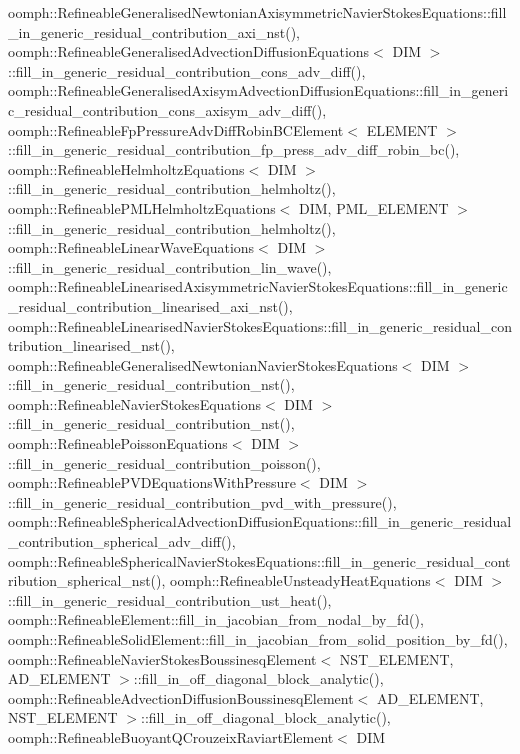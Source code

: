 oomph\+::\+Refineable\+Generalised\+Newtonian\+Axisymmetric\+Navier\+Stokes\+Equations\+::fill\+\_\+in\+\_\+generic\+\_\+residual\+\_\+contribution\+\_\+axi\+\_\+nst(), oomph\+::\+Refineable\+Generalised\+Advection\+Diffusion\+Equations$<$ D\+I\+M $>$\+::fill\+\_\+in\+\_\+generic\+\_\+residual\+\_\+contribution\+\_\+cons\+\_\+adv\+\_\+diff(), oomph\+::\+Refineable\+Generalised\+Axisym\+Advection\+Diffusion\+Equations\+::fill\+\_\+in\+\_\+generic\+\_\+residual\+\_\+contribution\+\_\+cons\+\_\+axisym\+\_\+adv\+\_\+diff(), oomph\+::\+Refineable\+Fp\+Pressure\+Adv\+Diff\+Robin\+B\+C\+Element$<$ E\+L\+E\+M\+E\+N\+T $>$\+::fill\+\_\+in\+\_\+generic\+\_\+residual\+\_\+contribution\+\_\+fp\+\_\+press\+\_\+adv\+\_\+diff\+\_\+robin\+\_\+bc(), oomph\+::\+Refineable\+Helmholtz\+Equations$<$ D\+I\+M $>$\+::fill\+\_\+in\+\_\+generic\+\_\+residual\+\_\+contribution\+\_\+helmholtz(), oomph\+::\+Refineable\+P\+M\+L\+Helmholtz\+Equations$<$ D\+I\+M, P\+M\+L\+\_\+\+E\+L\+E\+M\+E\+N\+T $>$\+::fill\+\_\+in\+\_\+generic\+\_\+residual\+\_\+contribution\+\_\+helmholtz(), oomph\+::\+Refineable\+Linear\+Wave\+Equations$<$ D\+I\+M $>$\+::fill\+\_\+in\+\_\+generic\+\_\+residual\+\_\+contribution\+\_\+lin\+\_\+wave(), oomph\+::\+Refineable\+Linearised\+Axisymmetric\+Navier\+Stokes\+Equations\+::fill\+\_\+in\+\_\+generic\+\_\+residual\+\_\+contribution\+\_\+linearised\+\_\+axi\+\_\+nst(), oomph\+::\+Refineable\+Linearised\+Navier\+Stokes\+Equations\+::fill\+\_\+in\+\_\+generic\+\_\+residual\+\_\+contribution\+\_\+linearised\+\_\+nst(), oomph\+::\+Refineable\+Generalised\+Newtonian\+Navier\+Stokes\+Equations$<$ D\+I\+M $>$\+::fill\+\_\+in\+\_\+generic\+\_\+residual\+\_\+contribution\+\_\+nst(), oomph\+::\+Refineable\+Navier\+Stokes\+Equations$<$ D\+I\+M $>$\+::fill\+\_\+in\+\_\+generic\+\_\+residual\+\_\+contribution\+\_\+nst(), oomph\+::\+Refineable\+Poisson\+Equations$<$ D\+I\+M $>$\+::fill\+\_\+in\+\_\+generic\+\_\+residual\+\_\+contribution\+\_\+poisson(), oomph\+::\+Refineable\+P\+V\+D\+Equations\+With\+Pressure$<$ D\+I\+M $>$\+::fill\+\_\+in\+\_\+generic\+\_\+residual\+\_\+contribution\+\_\+pvd\+\_\+with\+\_\+pressure(), oomph\+::\+Refineable\+Spherical\+Advection\+Diffusion\+Equations\+::fill\+\_\+in\+\_\+generic\+\_\+residual\+\_\+contribution\+\_\+spherical\+\_\+adv\+\_\+diff(), oomph\+::\+Refineable\+Spherical\+Navier\+Stokes\+Equations\+::fill\+\_\+in\+\_\+generic\+\_\+residual\+\_\+contribution\+\_\+spherical\+\_\+nst(), oomph\+::\+Refineable\+Unsteady\+Heat\+Equations$<$ D\+I\+M $>$\+::fill\+\_\+in\+\_\+generic\+\_\+residual\+\_\+contribution\+\_\+ust\+\_\+heat(), oomph\+::\+Refineable\+Element\+::fill\+\_\+in\+\_\+jacobian\+\_\+from\+\_\+nodal\+\_\+by\+\_\+fd(), oomph\+::\+Refineable\+Solid\+Element\+::fill\+\_\+in\+\_\+jacobian\+\_\+from\+\_\+solid\+\_\+position\+\_\+by\+\_\+fd(), oomph\+::\+Refineable\+Navier\+Stokes\+Boussinesq\+Element$<$ N\+S\+T\+\_\+\+E\+L\+E\+M\+E\+N\+T, A\+D\+\_\+\+E\+L\+E\+M\+E\+N\+T $>$\+::fill\+\_\+in\+\_\+off\+\_\+diagonal\+\_\+block\+\_\+analytic(), oomph\+::\+Refineable\+Advection\+Diffusion\+Boussinesq\+Element$<$ A\+D\+\_\+\+E\+L\+E\+M\+E\+N\+T, N\+S\+T\+\_\+\+E\+L\+E\+M\+E\+N\+T $>$\+::fill\+\_\+in\+\_\+off\+\_\+diagonal\+\_\+block\+\_\+analytic(), oomph\+::\+Refineable\+Buoyant\+Q\+Crouzeix\+Raviart\+Element$<$ D\+I\+M 